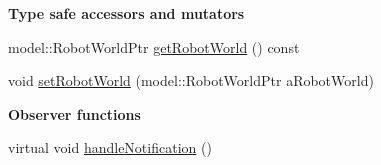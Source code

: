 \begin{Indent}{\bf Type safe accessors and mutators}\par
\begin{DoxyCompactItemize}
\item 
model\+::\+Robot\+World\+Ptr \hyperlink{class_view_1_1_robot_world_canvas_ae82885a5dd5ce493c8b3df3a7d0385a4}{get\+Robot\+World} () const
\item 
void \hyperlink{class_view_1_1_robot_world_canvas_a2829529a8b4221f072aeac196bbc9b17}{set\+Robot\+World} (model\+::\+Robot\+World\+Ptr a\+Robot\+World)
\end{DoxyCompactItemize}
\end{Indent}
\begin{Indent}{\bf Observer functions}\par
\begin{DoxyCompactItemize}
\item 
virtual void \hyperlink{class_view_1_1_robot_world_canvas_af24f07e5484dbba2edd563c826694098}{handle\+Notification} ()
\end{DoxyCompactItemize}
\end{Indent}
